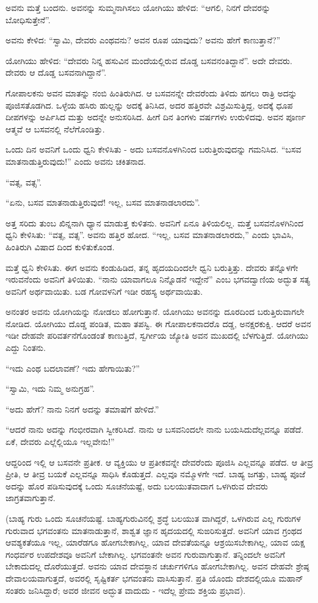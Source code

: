 ಅವನು ಮತ್ತೆ ಬಂದನು. ಅವನನ್ನು ಸುಮ್ಮನಾಗಿಸಲು ಯೋಗಿಯು ಹೇಳಿದ: “ಆಗಲಿ, ನಿನಗೆ ದೇವರನ್ನು ಬೋಧಿಸುತ್ತೇನೆ”.

ಅವನು ಕೇಳಿದ: “ಸ್ವಾಮಿ, ದೇವರು ಎಂಥವನು? ಅವನ ರೂಪ ಯಾವುದು? ಅವನು ಹೇಗೆ ಕಾಣುತ್ತಾನೆ?”

ಯೋಗಿಯು ಹೇಳಿದ: “ದೇವರು ನಿನ್ನ ಹಸುವಿನ ಮಂದೆಯಲ್ಲಿರುವ ದೊಡ್ಡ ಬಸವನಂತಿದ್ದಾನೆ”. ಅದೇ ದೇವರು. ದೇವರು ಆ ದೊಡ್ಡ ಬಸವನಾಗಿದ್ದಾನೆ”.

ಗೋಪಾಲಕನು ಅವನ ಮಾತನ್ನು ನಂಬಿ ಹಿಂತಿರುಗಿದ. ಆ ಬಸವನನ್ನೇ ದೇವರೆಂದು ತಿಳಿದು ಹಗಲು ರಾತ್ರಿ ಅದನ್ನು ಪೂಜಿಸತೊಡಗಿದ. ಒಳ್ಳೆಯ ಹಸಿರು ಹುಲ್ಲನ್ನು ಅದಕ್ಕೆ ತಿನಿಸಿದ, ಅದರ ಹತ್ತಿರವೇ ವಿಶ್ರಮಿಸುತ್ತಿದ್ದ, ಅದಕ್ಕೆ ಧೂಪ ದೀಪಗಳನ್ನು ಅರ್ಪಿಸಿದ ಮತ್ತು ಅದನ್ನೇ ಅನುಸರಿಸಿದ. ಹೀಗೆ ದಿನ ತಿಂಗಳು ವರ್ಷಗಳು ಉರುಳಿದವು. ಅವನ ಪೂರ್ಣ ಆತ್ಮವೆ ಆ ಬಸವನಲ್ಲಿ ನೆಲೆಗೊಂಡಿತ್ತು.

ಒಂದು ದಿನ ಅವನಿಗೆ ಒಂದು ಧ್ವನಿ ಕೇಳಿಸಿತು - ಅದು ಬಸವನೊಳಗಿನಿಂದ ಬರುತ್ತಿರುವುದನ್ನು ಗಮನಿಸಿದ. “ಬಸವ ಮಾತನಾಡುತ್ತಿರುವುದು!” ಎಂದು ಅವನು ಚಕಿತನಾದ.

“ವತ್ಸ, ವತ್ಸ”.

“ಏನು, ಬಸವ ಮಾತನಾಡುತ್ತಿರುವುದೆ! ಇಲ್ಲ, ಬಸವ ಮಾತನಾಡಲಾರದು”.

ಅತ್ತ ಸರಿದು ತುಂಬ ಖಿನ್ನನಾಗಿ ಧ್ಯಾನ ಮಾಡುತ್ತ ಕುಳಿತನು. ಅವನಿಗೆ ಏನೂ ತಿಳಿಯಲಿಲ್ಲ. ಮತ್ತೆ ಬಸವನೊಳಗಿನಿಂದ ಧ್ವನಿ ಕೇಳಿಸಿತು: “ವತ್ಸ, ವತ್ಸ”. ಅವನು ಹತ್ತಿರ ಹೋದ. “ಇಲ್ಲ, ಬಸವ ಮಾತನಾಡಲಾರದು,” ಎಂದು ಭಾವಿಸಿ, ಹಿಂತಿರುಗಿ ವಿಷಾದ ದಿಂದ ಕುಳಿತುಕೊಂಡ.

ಮತ್ತೆ ಧ್ವನಿ ಕೇಳಿಸಿತು. ಈಗ ಅವನು ಕಂಡುಹಿಡಿದ, ತನ್ನ ಹೃದಯದಿಂದಲೇ ಧ್ವನಿ ಬರುತ್ತಿತ್ತು. ದೇವರು ತನ್ನೊಳಗೇ ಇರುವನೆಂದು ಅವನಿಗೆ ತಿಳಿಯಿತು. “ನಾನು ಯಾವಾಗಲೂ ನಿನ್ನೊಡನೆ ಇದ್ದೇನೆ” ಎಂಬ ಭಗವದ್ವಾಣಿಯ ಅದ್ಭುತ ಸತ್ಯ ಅವನಿಗೆ ಅರ್ಥವಾಯಿತು. ಬಡ ಗೋವಳನಿಗೆ ಇಡೀ ರಹಸ್ಯ ಅರ್ಥವಾಯಿತು.

ಅನಂತರ ಅವನು ಯೋಗಿಯನ್ನು ನೋಡಲು ಹೋಗುತ್ತಾನೆ. ಯೋಗಿಯು ಅವನನ್ನು ದೂರದಿಂದ ಬರುತ್ತಿರುವಾಗಲೇ ನೋಡಿದ. ಯೋಗಿಯು ದೊಡ್ಡ ಪಂಡಿತ, ಮಹಾ ತಪಸ್ವಿ. ಈ ಗೋಪಾಲಕನಾದರೊ ದಡ್ಡ, ಅನಕ್ಷರಕುಕ್ಷಿ. ಆದರೆ ಅವನ ಇಡೀ ದೇಹವೇ ಪರಿವರ್ತನೆಗೊಂಡಂತೆ ಕಾಣುತ್ತಿದೆ, ಸ್ವರ್ಗೀಯ ಜ್ಯೋತಿ ಅವನ ಮುಖದಲ್ಲಿ ಬೆಳಗುತ್ತಿದೆ. ಯೋಗಿಯು ಎದ್ದು ನಿಂತನು.

“ಇದು ಎಂಥ ಬದಲಾವಣೆ? ಇದು ಹೇಗಾಯಿತು?”

“ಸ್ವಾಮಿ, ಇದು ನಿಮ್ಮ ಅನುಗ್ರಹ”.

“ಅದು ಹೇಗೆ? ನಾನು ನಿನಗೆ ಅದನ್ನು ತಮಾಷೆಗೆ ಹೇಳಿದೆ.”

“ಆದರೆ ನಾನು ಅದನ್ನು ಗಂಭೀರವಾಗಿ ಸ್ವೀಕರಿಸಿದೆ. ನಾನು ಆ ಬಸವನಿಂದಲೇ ನಾನು ಬಯಸಿದುದೆಲ್ಲವನ್ನೂ ಪಡೆದೆ. ಏಕೆ, ದೇವರು ಎಲ್ಲೆಲ್ಲಿಯೂ ಇಲ್ಲವೇನು!”

ಆದ್ದರಿಂದ ಇಲ್ಲಿ ಆ ಬಸವನೇ ಪ್ರತೀಕ. ಆ ವ್ಯಕ್ತಿಯು ಆ ಪ್ರತೀಕವನ್ನೇ ದೇವರೆಂದು ಪೂಜಿಸಿ ಎಲ್ಲವನ್ನೂ ಪಡೆದ. ಆ ತೀವ್ರ ಪ್ರೀತಿ, ಆ ತೀವ್ರ ಬಯಕೆ ಎಲ್ಲವನ್ನೂ ಸಾಧಿಸಿ ಕೊಡುತ್ತದೆ. ಎಲ್ಲವೂ ನಮ್ಮೊಳಗೇ ಇದೆ. ಬಾಹ್ಯ ಜಗತ್ತು, ಬಾಹ್ಯ ಪೂಜೆ ಅದನ್ನು ಹೊರ ಪಡಿಸುವುದಕ್ಕೆ ಒಂದು ಸೂಚನೆಯಷ್ಟೆ, ಅದು ಬಲಯುತವಾದಾಗ ಒಳಗಿರುವ ದೇವರು ಜಾಗ್ರತವಾಗುತ್ತಾನೆ.

(ಬಾಹ್ಯ ಗುರು ಒಂದು ಸೂಚನೆಯಷ್ಟೆ. ಬಾಹ್ಯಗುರುವಿನಲ್ಲಿ ಶ್ರದ್ಧೆ ಬಲಯುತ ವಾಗಿದ್ದರೆ, ಒಳಗಿರುವ ಎಲ್ಲ ಗುರುಗಳ ಗುರುವಾದ ಭಗವಂತನು ಮಾತನಾಡುತ್ತಾನೆ, ಶಾಶ್ವತ ಜ್ಞಾನ ಹೃದಯದಲ್ಲಿ ಸುಙರಿಸುತ್ತದೆ. ಅವನಿಗೆ ಯಾವ ಗ್ರಂಥದ ಆವಶ್ಯಕತೆಯೂ ಇಲ್ಲ, ಯಾರೆಡಗೂ ಹೋಗಬೇಕಾಗಿಲ್ಲ, ಯಾವ ದೇವತೆಯನ್ನೂ ಆಶ್ರಯಿಸಬೇಕಾಗಿಲ್ಲ, ಯಾವ ಯಕ್ಷ ಗಂಧರ್ವರ ಉಪದೇಶವೂ ಅವನಿಗೆ ಬೇಕಾಗಿಲ್ಲ. ಭಗವಂತನೇ ಅವನ ಗುರುವಾಗುತ್ತಾನೆ. ತನ್ನಿಂದಲೇ ಅವನಿಗೆ ಬೇಕಾದುದಲ್ಲ ದೊರೆಯುತ್ತದೆ. ಅವನು ಯಾವ ದೇವಸ್ಥಾನ ಚರ್ಚುಗಳಿಗೂ ಹೋಗಬೇಕಾಗಿಲ್ಲ. ಅವನ ದೇಹವೇ ಶ್ರೇಷ್ಠ ದೇವಾಲಯವಾಗುತ್ತದೆ, ಅವರಲ್ಲಿ ಸೃಷ್ಟಿಕರ್ತ ಭಗವಂತನು ವಾಸಿಸುತ್ತಾನೆ. ಪ್ರತಿ ಯೊಂದು ದೇಶದಲ್ಲಿಯೂ ಮಹಾನ್ ಸಂತರು ಜನಿಸಿದ್ದಾರೆ; ಅವರ ಜೀವನ ಅದ್ಭುತ ವಾದುದು - ಇದೆಲ್ಲ ಪ್ರೇಮ ಶಕ್ತಿಯ ಪ್ರಭಾವ).

